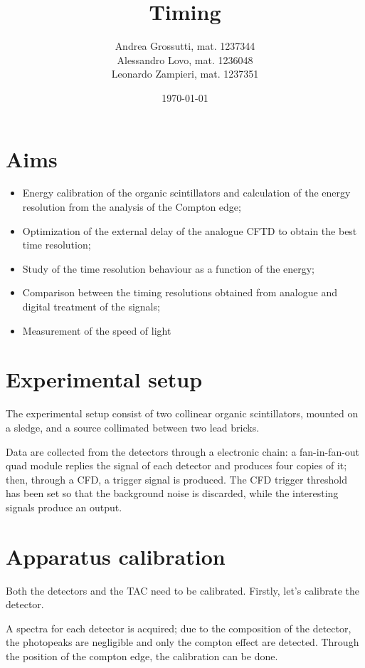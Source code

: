 \documentclass[11pt,a4 paper]{article}
\title{Timing}
\author{Andrea Grossutti, mat. 1237344\\Alessandro Lovo, mat. 1236048\\Leonardo Zampieri, mat. 1237351}
\date{\today}
\begin{document}
\maketitle

\section{Aims}
\begin{itemize}
    \item Energy calibration of the organic scintillators and calculation of the energy resolution from the analysis of the Compton edge;
    \item Optimization of the external delay of the analogue CFTD to obtain the best time resolution;
    \item Study of the time resolution behaviour as a function of the energy;
    \item Comparison between the timing resolutions obtained from analogue and digital treatment of the signals;
    \item Measurement of the speed of light
\end{itemize}

\section{Experimental setup}
The experimental setup consist of two collinear organic scintillators, mounted on a sledge, and a  source collimated between two lead bricks.

Data are collected from the detectors through a electronic chain: a fan-in-fan-out quad module replies the signal of each detector and produces four copies of it; then, through a CFD, a trigger signal is produced. The CFD trigger threshold has been set so that the background noise is discarded, while the interesting signals produce an output.

\section{Apparatus calibration}
Both the detectors and the TAC need to be calibrated. Firstly, let's calibrate the detector.

A spectra for each detector is acquired; due to the composition of the detector, the photopeaks are negligible and only the compton effect are detected. Through the position of the compton edge, the calibration can be done. 
\end{document}
